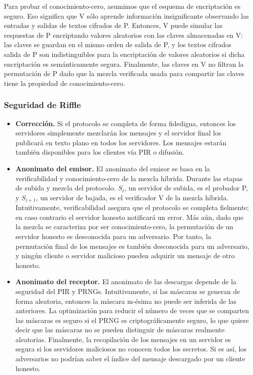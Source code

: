 Para probar el conocimiento-cero, asumimos que el esquema de encriptación es seguro. Eso significa que V sólo aprende información insignificante observando las entradas y salidas de textos cifrados de P. Entonces, V puede simular las respuestas de P encriptando valores aleatorios con las claves almacenadas en V: las claves se guardan en el mismo orden de salida de P, y los textos cifrados salida de P son indistinguibles para la encriptación de valores aleatorios si dicha encriptación es semánticamente segura. Finalmente, las claves en V no filtran la permutación de P dado que la mezcla verificada usada para compartir las claves tiene la propiedad de conocimiento-cero. 

\subsubsection{Seguridad de Riffle}
\begin{itemize}
	\item \textbf{Corrección.} Si el protocolo se completa de forma fidedigna, entonces los servidores simplemente mezclarán los mensajes y el servidor final los publicará en texto plano en todos los servidores. Los mensajes estarán también disponibles para los clientes vía PIR o difusión. 
	\item \textbf{Anonimato del emisor.} El anonimato del emisor se basa en la verificabilidad y conocimiento-cero de la mezcla híbrida. Durante las etapas de subida y mezcla del protocolo. $S_i$, un servidor de subida, es el probador P, y $S_{i+1}$, un servidor de bajada, es el verificador V de la mezcla híbrida. Intuitivamente, verificabilidad asegura que el protocolo se completa fielmente; en caso contrario el servidor honesto notificará un error. Más aún, dado que la mezcla se caracteriza por ser conocimiento-cero, la permutación de un servidor honesto es desconocida para un adversario. Por tanto, la permutación final de los mensajes es también desconocida para un adversario, y ningún cliente o servidor malicioso pueden adquirir un mensaje de otro honesto. 
	\item \textbf{Anonimato del receptor.} El anonimato de las descargas depende de la seguridad del PIR y PRNGs. Intuitivamente, 
	si las máscaras se generan de forma aleatoria, entonces la máscara m-ésima no puede ser inferida de las anteriores. La optimización para reducir el número de veces que se comparten las máscaras es seguro si el PRNG es criptográficamente seguro, lo que quiere decir que las máscaras no se pueden distinguir de máscaras realmente aleatorias. Finalmente, la recopilación de los mensajes en un servidor es segura si los servidores maliciosos no conocen todos los secretos. Si es así, los adversarios no podrían saber el índice del mensaje descargado por un cliente honesto.
\end{itemize}